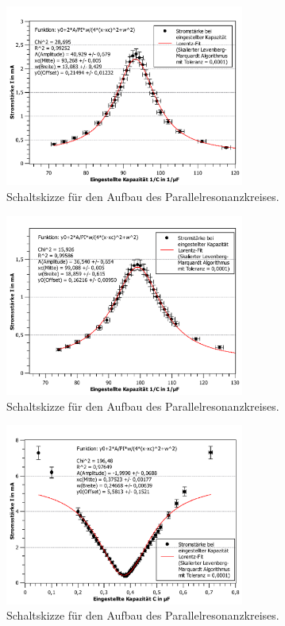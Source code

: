 	\begin{figure}[ht]
		\centering
		\includegraphics[width=0.7\textwidth]{auswertung/Reihe-200ohm(algo).pdf}
		\caption{Schaltskizze für den Aufbau des Parallelresonanzkreises.}
		\label{fig:reihe200}	
	\end{figure}
	\begin{figure}[ht]
		\centering
		\includegraphics[width=0.7\textwidth]{auswertung/Reihe-500ohm(algo).pdf}
		\caption{Schaltskizze für den Aufbau des Parallelresonanzkreises.}
		\label{fig:reihe500}	
	\end{figure}
	\begin{figure}[ht]
		\centering
		\includegraphics[width=0.7\textwidth]{auswertung/Parallel-infohm(algo).pdf}
		\caption{Schaltskizze für den Aufbau des Parallelresonanzkreises.}
		\label{fig:parallelinf}	
	\end{figure}
